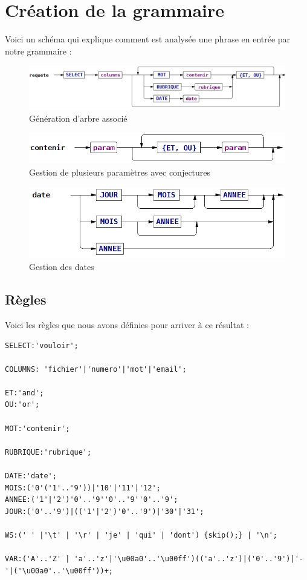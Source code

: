 \section{Création de la grammaire}

Voici un schéma qui explique comment est analysée une phrase en entrée par notre grammaire :

\begin{figure}[H]
    \centering\includegraphics[width=1\textwidth]{images/grammaire.png}
    \caption{Génération d'arbre associé}
\end{figure}

\begin{figure}[H]
    \centering\includegraphics[width=1\textwidth]{images/param.png}
    \caption{Gestion de plusieurs paramètres avec conjectures}
\end{figure}

\begin{figure}[H]
    \centering\includegraphics[width=1\textwidth]{images/date.png}
    \caption{Gestion des dates}
\end{figure}

\subsection{Règles}

Voici les règles que nous avons définies pour arriver à ce résultat :

\begin{lstlisting}
SELECT:'vouloir';

COLUMNS: 'fichier'|'numero'|'mot'|'email';

ET:'and';
OU:'or';

MOT:'contenir';

RUBRIQUE:'rubrique';

DATE:'date';
MOIS:('0'('1'..'9'))|'10'|'11'|'12';
ANNEE:('1'|'2')'0'..'9''0'..'9''0'..'9';
JOUR:('0'..'9')|(('1'|'2')'0'..'9')|'30'|'31';

WS:(' ' |'\t' | '\r' | 'je' | 'qui' | 'dont') {skip();} | '\n';

VAR:('A'..'Z' | 'a'..'z'|'\u00a0'..'\u00ff')(('a'..'z')|('0'..'9')|'-'|('\u00a0'..'\u00ff'))+;
\end{lstlisting}

